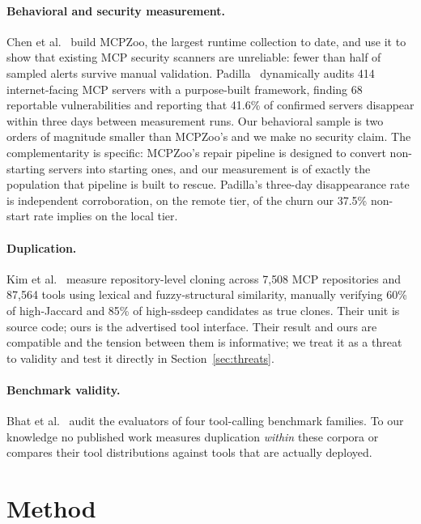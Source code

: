 \documentclass[11pt]{article}
\begin{document}
\paragraph{Behavioral and security measurement.}
Chen et al.~\cite{mcpzoo} build MCPZoo, the largest runtime collection to date,
and use it to show that existing MCP security scanners are unreliable: fewer than
half of sampled alerts survive manual validation. Padilla~\cite{exposed}
dynamically audits 414 internet-facing MCP servers with a purpose-built
framework, finding 68 reportable vulnerabilities and reporting that 41.6\% of
confirmed servers disappear within three days between measurement runs. Our
behavioral sample is two orders of magnitude smaller than MCPZoo's and we make no
security claim. The complementarity is specific: MCPZoo's repair pipeline is
designed to convert non-starting servers into starting ones, and our measurement
is of exactly the population that pipeline is built to rescue. Padilla's
three-day disappearance rate is independent corroboration, on the remote tier,
of the churn our 37.5\% non-start rate implies on the local tier.

\paragraph{Duplication.}
Kim et al.~\cite{cloning} measure repository-level cloning across 7{,}508 MCP
repositories and 87{,}564 tools using lexical and fuzzy-structural similarity,
manually verifying 60\% of high-Jaccard and 85\% of high-ssdeep candidates as true
clones. Their unit is source code; ours is the advertised tool interface. Their
result and ours are compatible and the tension between them is informative; we
treat it as a threat to validity and test it directly in
Section~\ref{sec:threats}.

\paragraph{Benchmark validity.}
Bhat et al.~\cite{benchaudit} audit the evaluators of four tool-calling benchmark
families. To our knowledge no published work measures duplication \emph{within}
these corpora or compares their tool distributions against tools that are
actually deployed.

\section{Method}
\label{sec:method}
\end{document}
